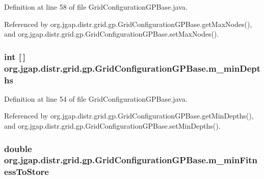 Definition at line 58 of file Grid\-Configuration\-G\-P\-Base.\-java.



Referenced by org.\-jgap.\-distr.\-grid.\-gp.\-Grid\-Configuration\-G\-P\-Base.\-get\-Max\-Nodes(), and org.\-jgap.\-distr.\-grid.\-gp.\-Grid\-Configuration\-G\-P\-Base.\-set\-Max\-Nodes().

\hypertarget{classorg_1_1jgap_1_1distr_1_1grid_1_1gp_1_1_grid_configuration_g_p_base_ace1dc28643f001bfdedacf3fa0f241d9}{
\subsubsection[{m\-\_\-min\-Depths}]{\setlength{\rightskip}{0pt plus 5cm}int \mbox{[}$\,$\mbox{]} org.\-jgap.\-distr.\-grid.\-gp.\-Grid\-Configuration\-G\-P\-Base.\-m\-\_\-min\-Depths\hspace{0.3cm}{\ttfamily [private]}}}\label{classorg_1_1jgap_1_1distr_1_1grid_1_1gp_1_1_grid_configuration_g_p_base_ace1dc28643f001bfdedacf3fa0f241d9}


Definition at line 54 of file Grid\-Configuration\-G\-P\-Base.\-java.



Referenced by org.\-jgap.\-distr.\-grid.\-gp.\-Grid\-Configuration\-G\-P\-Base.\-get\-Min\-Depths(), and org.\-jgap.\-distr.\-grid.\-gp.\-Grid\-Configuration\-G\-P\-Base.\-set\-Min\-Depths().

\hypertarget{classorg_1_1jgap_1_1distr_1_1grid_1_1gp_1_1_grid_configuration_g_p_base_a4124a94a68dfcbdd84b9f2d8748235b5}{
\subsubsection[{m\-\_\-min\-Fitness\-To\-Store}]{\setlength{\rightskip}{0pt plus 5cm}double org.\-jgap.\-distr.\-grid.\-gp.\-Grid\-Configuration\-G\-P\-Base.\-m\-\_\-min\-Fitness\-To\-Store\hspace{0.3cm}{\ttfamily [private]}}}\label{classorg_1_1jgap_1_1distr_1_1grid_1_1gp_1_1_grid_configuration_g_p_base_a4124a94a68dfcbdd84b9f2d8748235b5}


